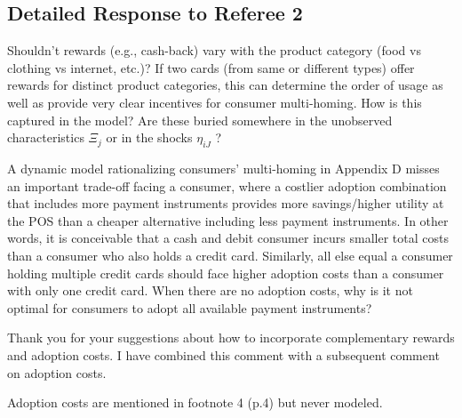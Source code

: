 \documentclass[main.tex]{subfiles}
\begin{document}
\begin{refsection}
\section*{Detailed Response to Referee 2}

\begin{refcommentnoclear}
Shouldn't rewards (e.g., cash-back) vary with the product category (food vs clothing vs internet, etc.)?
If two cards (from same or different types) offer rewards for distinct product categories, this can determine the order of usage as well as provide very clear incentives for consumer multi-homing.
How is this captured in the model?
Are these buried somewhere in the unobserved characteristics \(\Xi_j\) or in the shocks \(\eta_{iJ}\) ?

A dynamic model rationalizing consumers' multi-homing in Appendix D misses an important trade-off facing a consumer, where a costlier adoption combination that includes more payment instruments provides more savings/higher utility at the POS than a cheaper alternative including less payment instruments.
In other words, it is conceivable that a cash and debit consumer incurs smaller total costs than a consumer who also holds a credit card.
Similarly, all else equal a consumer holding multiple credit cards should face higher adoption costs than a consumer with only one credit card.
When there are no adoption costs, why is it not optimal for consumers to adopt all available payment instruments?
\end{refcommentnoclear}

Thank you for your suggestions about how to incorporate complementary rewards and adoption costs.
I have combined this comment with a subsequent comment on adoption costs.

\begin{refcommentnoclear}
    Adoption costs are mentioned in footnote 4 (p.4) but never modeled.
\end{refcommentnoclear}
    
\replymultihome


\end{refsection}
\end{document}
